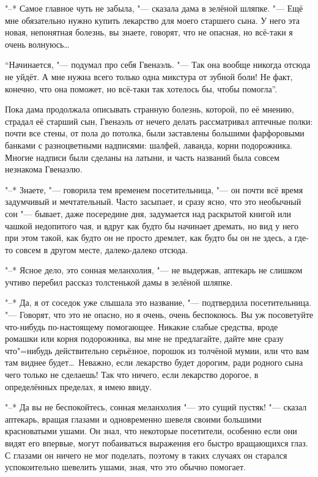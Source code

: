 "--* Самое главное чуть не забыла, "--- сказала дама в зелёной шляпке.
"--- Ещё мне обязательно нужно купить лекарство для моего старшего сына.
У него эта новая, непонятная болезнь, вы знаете, говорят, что не опасная, но
всё-таки я очень волнуюсь\ldots

\enquote{Начинается, "--- подумал про себя Гвенаэль.
"--- Так она вообще никогда отсюда не уйдёт.
А мне нужна всего только одна микстура от зубной боли!
Не факт, конечно, что она поможет, но всё-таки так хотелось бы, чтобы помогла}.

Пока дама продолжала описывать странную болезнь, которой, по её мнению, страдал
её старший сын, Гвенаэль от нечего делать рассматривал аптечные полки: почти
все стены, от пола до потолка, были заставлены большими фарфоровыми банками с
разноцветными надписями: шалфей, лаванда, корни подорожника.
Многие надписи были сделаны на латыни, и часть названий была совсем незнакома
Гвенаэлю.

"--* Знаете, "--- говорила тем временем посетительница, "--- он почти всё время
задумчивый и мечтательный.
Часто засыпает, и сразу ясно, что это необычный сон "--- бывает, даже
посередине дня, задумается над раскрытой книгой или чашкой недопитого чая, и
вдруг как будто бы начинает дремать, но вид у него при этом такой, как будто он
не просто дремлет, как будто бы он не здесь, а где-то совсем в другом месте,
далеко-далеко отсюда.

"--* Ясное дело, это сонная меланхолия, "--- не выдержав, аптекарь не слишком
учтиво перебил рассказ толстенькой дамы в зелёной шляпке.

"--* Да, я от соседок уже слышала это название, "--- подтвердила
посетительница.
"--- Говорят, что это не опасно, но я очень, очень беспокоюсь.
Вы уж посоветуйте что-нибудь по-настоящему помогающее.
Никакие слабые средства, вроде ромашки или корня подорожника, вы мне не
предлагайте, дайте мне сразу что"=нибудь действительно серьёзное, порошок из
толчёной мумии, или что вам там виднее будет\ldots\
Неважно, если лекарство будет дорогим, ради родного сына чего только не
сделаешь!
Так что ничего, если лекарство дорогое, в определённых пределах, я имею ввиду.

"--* Да вы не беспокойтесь, сонная меланхолия "--- это сущий пустяк! "---
сказал аптекарь, вращая глазами и одновременно шевеля своими большими
красноватыми ушами.
Он знал, что некоторые посетители, особенно если они видят его впервые, могут
побаиваться выражения его быстро вращающихся глаз.
С глазами он ничего не мог поделать, поэтому в таких случаях он старался
успокоительно шевелить ушами, зная, что это обычно помогает.

